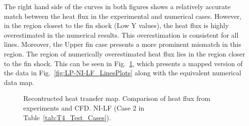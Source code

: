 \documentclass{AIAA}
\begin{document}
The right hand side of the curves in both figures shows a relatively accurate match between the heat flux in the experimental and numerical cases. However, in the region closest to the fin shock (Low Y values), the heat flux is highly overestimated in the numerical results. This overestimation is consistent for all lines. Moreover, the Upper fin case presents a more prominent mismatch in this region. The region of numerically overestimated heat flux lies in the region closer to the fin shock. This can be seen in Fig.~\ref{fig:HeatFluxNILF}, which presents a mapped version of the data in Fig.~\ref{fig:LP-NI-LF_LinesPlots} along with the equivalent numerical data map.

\begin{figure}[!h]
\center
\begin{adjustbox}{max width=1.1\columnwidth,center}
%
\end{adjustbox}
\caption{Recontructed heat transfer map. Comparison of heat flux from experiments and CFD. NI-LF (Case 2 in Table~\ref{tab:T4_Test_Cases}).}
\label{fig:HeatFluxNILF}
\end{figure} 
\end{document}
